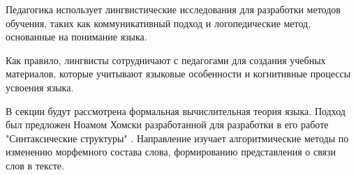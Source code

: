 Педагогика использует лингвистические исследования для разработки методов обучения, 
таких как коммуникативный подход и логопедические метод, основанные на понимание языка.

Как правило, лингвисты сотрудничают с педагогами для создания учебных материалов, которые учитывают языковые особенности и когнитивные процессы усвоения языка.

В секции будут рассмотрена формальная вычислительная теория языка.
Подход был предложен Ноамом Хомски разработанной для разработки
в его работе "Синтаксические структуры" \cite{chomsky2002syntactic}. Направление изучает алгоритмические 
методы по изменению морфемного состава слова, формированию представления о связи слов в тексте.





